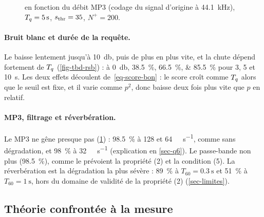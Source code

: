 \begin{figure}[t]
  \centering
  \begin{minipage}[t]{0.48\linewidth}
    \centering
    \caption{\TBD{} en fonction du \RSB{}, bruit blanc ajouté à \qty{8}{\kilo\hertz}, une
    courbe par $\Tq$ ; losanges : brouhaha réel, $\Tq = \qty{5}{\second}$. $\sthr = 35$,
    $N^+ = 200$, $\TFD = 0/50$ partout.}
    \label{fig-tbd-rsb}
  \end{minipage}\hfill
  \begin{minipage}[t]{0.48\linewidth}
    \centering
    \caption{\TBD{} en fonction du débit MP3 (codage du signal d'origine à
    \qty{44.1}{\kilo\hertz}), $\Tq = \qty{5}{\second}$, $\sthr = 35$, $N^+ = 200$.}
    \label{fig-tbd-mp3}
  \end{minipage}
\end{figure}

\paragraph{Bruit blanc et durée de la requête.} Le \TBD{} baisse lentement jusqu'à
\qty{10}{\decibel}, puis de plus en plus vite, et la chute dépend fortement de $\Tq$
(\cref{fig-tbd-rsb}) : à \qty{0}{\decibel}, \qtylist{38.5;66.5;85.5}{\percent} pour 3, 5 et
\qty{10}{\second}. Les deux effets découlent de~\eqref{eq-score-bon} : le score croît comme
$\Tq$ alors que le seuil est fixe, et il varie comme $p^2$, donc baisse deux fois plus vite
que $p$ en relatif.

\paragraph{MP3, filtrage et réverbération.} Le MP3 ne gêne presque pas
(\cref{fig-tbd-mp3}) : \qty{98.5}{\percent} à 128 et \qty{64}{\kilo\bit\per\second}, comme sans
dégradation, et \qty{98}{\percent} à \qty{32}{\kilo\bit\per\second} (explication en
\cref{sec-q6}). Le passe-bande non plus (\qty{98.5}{\percent}), comme le prévoient la
propriété (2) et la condition (5). La réverbération est la dégradation la plus sévère :
\qty{89}{\percent} à $T_{60} = \qty{0.3}{\second}$ et \qty{51}{\percent} à
$T_{60} = \qty{1}{\second}$, hors du domaine de validité de la propriété (2)
(\cref{sec-limites}).
\subsection{Théorie confrontée à la mesure}
\label{sec-theorie-mesure}


